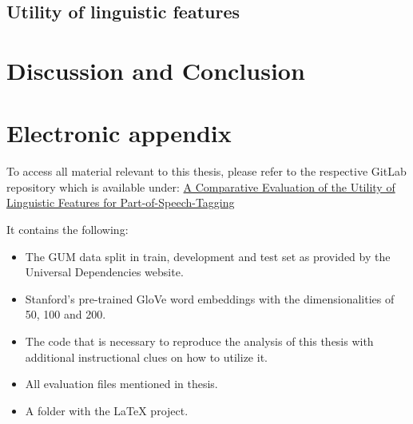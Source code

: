 \documentclass[12pt]{article}
\begin{document}
\subsection{Utility of linguistic features}
\label{res_feature}



\section{Discussion and Conclusion}


\newpage




\setcounter{page}{3} %

\appendix

\section{Electronic appendix}
\label{el_app}

To access all material relevant to this thesis, please refer to the respective GitLab repository which is available under: \href{https://gitlab.lrz.de/statistics/summer22/ba_floess.git}{A Comparative Evaluation of the Utility of Linguistic Features for Part-of-Speech-Tagging}

It contains the following:
\begin{itemize}
  \item The GUM data split in train, development and test set as provided by the Universal Dependencies website.
  \item Stanford's pre-trained GloVe word embeddings with the dimensionalities of 50, 100 and 200.
  \item The code that is necessary to reproduce the analysis of this thesis with additional instructional clues on how to utilize it.
  \item All evaluation files mentioned in thesis.
  \item A folder with the LaTeX project.
\end{itemize}


\newpage



\RaggedRight


\newpage
\end{document}

